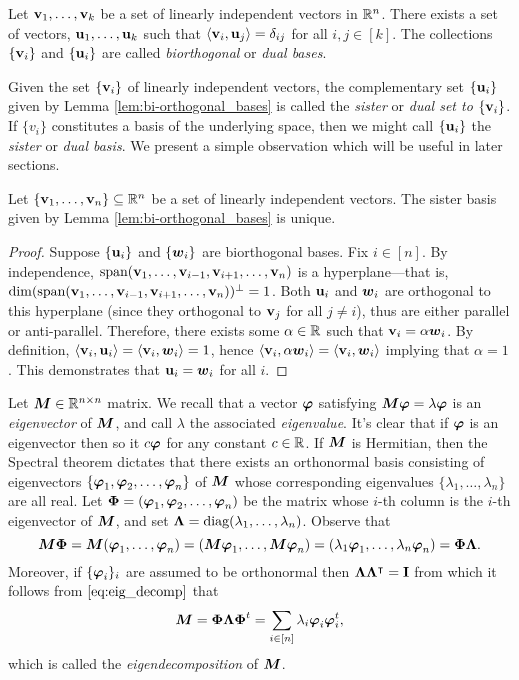 \begin{lemma}
\label{lem:bi-orthogonal_bases}
Let $\vb{v}_1,\dots,\vb{v}_k$ be a set of linearly independent vectors in $\mathbb{R}^n$. There exists a set of vectors, $\vb{u}_1,\dots,\vb{u}_k$ such that $\langle \vb{v}_i,\vb{u}_j\rangle = \delta_{ij}$ for all $i,j\in[k]$. The collections $\{\vb{v}_i\}$ and $\{\vb{u}_i\}$ are called \emph{biorthogonal} or \emph{dual bases}.  
\end{lemma}

Given the set $\{\vb{v}_i\}$ of linearly independent vectors, the complementary set $\{\vb{u}_i\}$ given by Lemma \ref{lem:bi-orthogonal_bases} is called the \emph{sister} or \emph{dual set to $\{\vb{v}_i\}$}. If $\{v_i\}$ constitutes a basis of the underlying space, then we might call $\{\vb{u}_i\}$ the \emph{sister} or \emph{dual basis}.  We present a simple observation which will be useful in later sections. 

\begin{observation}
\label{obs:bi-orthogonal_unique}
Let $\{\vb{v}_1,\dots,\vb{v}_n\}\subseteq\mathbb{R}^n$ be a set of linearly independent vectors. The sister basis given by Lemma \ref{lem:bi-orthogonal_bases} is unique. 
\end{observation}
\begin{proof}
Suppose $\{\vb{u}_i\}$ and $\{\vb*{w}_i\}$ are biorthogonal bases. Fix $i\in[n]$. By independence, $\textnormal{span}(\vb{v}_1,\dots,\vb{v}_{i-1},\vb{v}_{i+1},\dots,\vb{v}_n)$ is a hyperplane---that is, $\dim(\textnormal{span}(\vb{v}_1,\dots,\vb{v}_{i-1},\vb{v}_{i+1},\dots,\vb{v}_n))^\perp=1$. Both $\vb{u}_i$ and $\vb*{w}_i$ are orthogonal to this hyperplane (since they orthogonal to $\vb{v}_j$ for all $j\neq i$), thus are either parallel or anti-parallel. Therefore, there exists some $\alpha\in\mathbb{R}$ such that $\vb{v}_i=\alpha\vb*{w}_i$. By definition, $\langle \vb{v}_i,\vb{u}_i\rangle = \langle \vb{v}_i,\vb*{w}_i\rangle =1$, hence $\langle \vb{v}_i,\alpha \vb*{w}_i\rangle = \langle \vb{v}_i,\vb*{w}_i\rangle$ implying that $\alpha=1$. This demonstrates that $\vb{u}_i=\vb*{w}_i$ for all $i$. 
\end{proof}

Let ${\vb*{M}}\in\mathbb{R}^{n\times n}$ matrix. We recall that a vector $\vb*{\varphi}$ satisfying ${\vb*{M}}\vb*{\varphi}=\lambda\vb*{\varphi}$ is an \emph{eigenvector} of ${\vb*{M}}$, and call $\lambda$ the associated \emph{eigenvalue}. It's clear that if $\vb*{\varphi}$ is an eigenvector then so it $c\vb*{\varphi}$ for any constant $c\in \mathbb{R}$. If ${\vb*{M}}$ is Hermitian, then the Spectral theorem dictates that there exists an orthonormal basis consisting of eigenvectors $\{\vb*{\varphi}_1,\vb*{\varphi}_2,\dots,\vb*{\varphi}_n\}$ of ${\vb*{M}}$ whose corresponding eigenvalues $\{\lambda_1,\dots,\lambda_n\}$ are all real. Let $\boldsymbol{\Phi}=(\vb*{\varphi}_1,\vb*{\varphi}_2,\dots,\vb*{\varphi}_n)$ be the matrix whose $i$-th column is the $i$-th eigenvector of ${\vb*{M}}$, and set $\vb{\Lambda}=\text{diag}(\lambda_1,\dots,\lambda_n)$. Observe that 
\begin{equation}
\label{eq:eig_decomp}
{\vb*{M}}\boldsymbol{\Phi}={\vb*{M}}(\vb*{\varphi}_1,\dots,\vb*{\varphi}_n)=({\vb*{M}}\vb*{\varphi}_1,\dots,{\vb*{M}}\vb*{\varphi}_n)=(\lambda_1\vb*{\varphi}_1,\dots,\lambda_n\vb*{\varphi}_n)=\boldsymbol{\Phi}\vb{\Lambda}.
\end{equation}
Moreover, if $\{\vb*{\varphi}_i\}_i$ are assumed to be orthonormal then $\vb{\Lambda}\vb{\Lambda}^\intercal=\vb{I}$ from which it follows from $\eqref{eq:eig_decomp}$ that \begin{equation}
    \label{eq:eig_decomp2}
    {\vb*{M}}=\boldsymbol{\Phi}\vb{\Lambda}\boldsymbol{\Phi}^t = \sum_{i\in[n]}\lambda_i\vb*{\varphi}_i\vb*{\varphi}_i^t,
\end{equation}
which is called the \emph{eigendecomposition} of ${\vb*{M}}$. 

